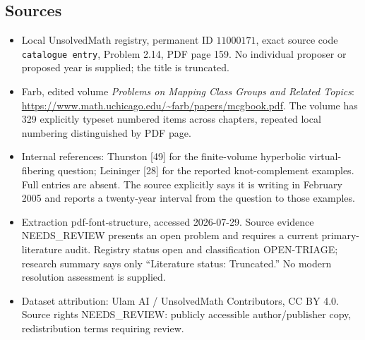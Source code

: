 \documentclass[11pt]{article}
\begin{document}
\subsection{Sources}
\begin{itemize}
\item Local UnsolvedMath registry, permanent ID \(11000171\), exact source code \texttt{catalogue entry}, Problem 2.14, PDF page 159. No individual proposer or proposed year is supplied; the title is truncated.
\item Farb, edited volume \emph{Problems on Mapping Class Groups and Related Topics}: \url{https://www.math.uchicago.edu/~farb/papers/mcgbook.pdf}. The volume has 329 explicitly typeset numbered items across chapters, repeated local numbering distinguished by PDF page.
\item Internal references: Thurston [49] for the finite-volume hyperbolic virtual-fibering question; Leininger [28] for the reported knot-complement examples. Full entries are absent. The source explicitly says it is writing in February 2005 and reports a twenty-year interval from the question to those examples.
\item Extraction pdf-font-structure, accessed 2026-07-29. Source evidence NEEDS\_REVIEW presents an open problem and requires a current primary-literature audit. Registry status open and classification OPEN-TRIAGE; research summary says only ``Literature status: Truncated.'' No modern resolution assessment is supplied.
\item Dataset attribution: Ulam AI / UnsolvedMath Contributors, CC BY 4.0. Source rights NEEDS\_REVIEW: publicly accessible author/publisher copy, redistribution terms requiring review.
\end{itemize}
\end{document}

